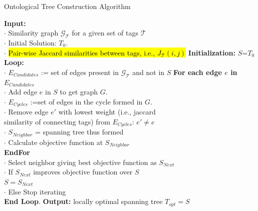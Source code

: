 \begin{algorithm}
\fontsize{8pt}{1em}\selectfont
\caption{Ontological Tree Construction Algorithm}
\label{algo:STCAlgorithm} 
\textbf{Input:} \\
$\cdot$ Similarity graph $\mathcal{G_T}$ for a given set of tags $\mathcal{T}$ \\ 
$\cdot$ Initial Solution: $T_0$. \\
$\cdot$ \hl{Pair-wise Jaccard similarities between tags, i.e., $J_{\mathcal{T}}(i,j)$}
\textbf{Initialization:} 
$S$=$T_0$ \\
\textbf{Loop: } \\
\hspace*{5mm} $\cdot$ $E_{Candidates}$ := set of edges present in $\mathcal{G_T}$ and not in $S$ 
\hspace*{5mm} \textbf{For each edge $e$ in $E_{Candidates}$} \\
\hspace*{10mm} $\cdot$ Add edge $e$ in $S$ to get graph $G$. \\
\hspace*{10mm} $\cdot$ $E_{Cycles}$ :=set of edges in the cycle formed in $G$. \\
\hspace*{10mm} $\cdot$ Remove edge $e'$ with lowest weight (i.e., jaccard \\
\hspace*{10mm} \; similarity of connecting tags) from $E_{Cycles}$: $e' \neq e$ \\
\hspace*{10mm} $\cdot$ $S_{Neighbor}$ = spanning tree thus formed  \\
\hspace*{10mm} $\cdot$ Calculate objective function at $S_{Neighbor}$ \\
\hspace*{5mm} \textbf{EndFor} \\
\hspace*{5mm} $\cdot$ Select neighbor giving best objective function as $S_{Next}$ \\
\hspace*{5mm} $\cdot$ If $S_{Next}$ improves objective function over $S$ \\
\hspace*{10mm} $S=S_{Next}$ \\
\hspace*{5mm} $\cdot$ Else Stop iterating \\ 
\textbf{End Loop}. \textbf{Output:} locally optimal spanning tree $T_{opt}=S$
\end{algorithm}

